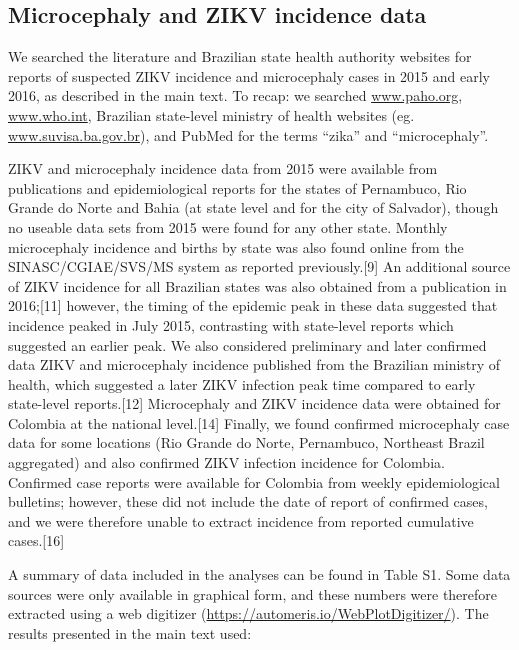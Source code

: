 \documentclass[10pt,letterpaper]{article}
\begin{document}
\subsection{Microcephaly and ZIKV incidence
data}\label{microcephaly-and-zikv-incidence-data}

We searched the literature and Brazilian state health authority websites
for reports of suspected ZIKV incidence and microcephaly cases in 2015
and early 2016, as described in the main text. To recap: we searched
\href{www.paho.org}{www.paho.org}, \href{www.who.int}{www.who.int},
Brazilian state-level ministry of health websites (eg.
\href{www.suvisa.ba.gov.br}{www.suvisa.ba.gov.br}), and PubMed for the
terms ``zika'' and ``microcephaly''.

ZIKV and microcephaly incidence data from 2015 were available from
publications and epidemiological reports for the states of Pernambuco,
Rio Grande do Norte and Bahia (at state level and for the city of
Salvador), though no useable data sets from 2015 were found for any
other state. Monthly microcephaly incidence and births by state was also
found online from the SINASC/CGIAE/SVS/MS system as reported
previously.{[}9{]} An additional source of ZIKV incidence for all
Brazilian states was also obtained from a publication in 2016;{[}11{]}
however, the timing of the epidemic peak in these data suggested that
incidence peaked in July 2015, contrasting with state-level reports
which suggested an earlier peak. We also considered preliminary and
later confirmed data ZIKV and microcephaly incidence published from the
Brazilian ministry of health, which suggested a later ZIKV infection
peak time compared to early state-level reports.{[}12{]} Microcephaly
and ZIKV incidence data were obtained for Colombia at the national
level.{[}14{]} Finally, we found confirmed microcephaly case data for
some locations (Rio Grande do Norte, Pernambuco, Northeast Brazil
aggregated) and also confirmed ZIKV infection incidence for Colombia.
Confirmed case reports were available for Colombia from weekly
epidemiological bulletins; however, these did not include the date of
report of confirmed cases, and we were therefore unable to extract
incidence from reported cumulative cases.{[}16{]}

A summary of data included in the analyses can be found in Table S1.
Some data sources were only available in graphical form, and these
numbers were therefore extracted using a web digitizer
(\href{https://automeris.io/WebPlotDigitizer/}{https://automeris.io/WebPlotDigitizer/}).
The results presented in the main text used:
\end{document}
